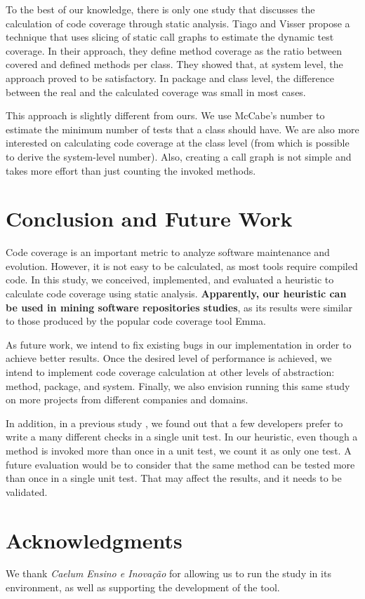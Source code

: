 \documentclass{sig-alternate}
\begin{document}
To the best of our knowledge, there is only one study that discusses the calculation of
code coverage through static analysis. Tiago and Visser \cite{tiago} propose a
technique that uses slicing of static call graphs to estimate the
dynamic test coverage. 
In their approach, they define method coverage as the ratio between covered 
and defined methods per class. They showed that, at system level, the approach
proved to be satisfactory. In package and class level, the difference between
the real and the calculated coverage was small in most cases.

This approach is slightly different from ours. We use McCabe's number to estimate the
minimum number of tests that a class should have. We are also more interested on calculating
code coverage at the class level (from which is possible to derive the system-level number). 
Also, creating a call graph is not simple and takes more effort than just counting
the invoked methods.

\section{Conclusion and Future Work}
\label{sec-conclusion}

Code coverage is an important metric to analyze software maintenance and evolution. However, it is 
not easy to be calculated, as most tools require compiled code. In this study, we conceived, implemented, 
and evaluated a heuristic to calculate code coverage using static analysis. 
\textbf{Apparently, our heuristic can be used in mining software repositories studies}, 
as its results were similar to those produced by the popular code coverage tool Emma. 

As future work, we intend to fix existing bugs in our implementation in order to
achieve better results. Once the desired level of performance is achieved, we intend to implement code coverage
calculation at other levels of abstraction: method, package, and system. Finally, we also 
envision running this same study on more projects from different companies and domains.

In addition, in a previous study \cite{aniche-csmr}, 
we found out that a few developers prefer to write a many different checks in a single
unit test. In our heuristic, even though a method is invoked more than once in a unit test, we count it 
as only one test. A future evaluation would be to consider that the same method can be tested more than once
in a single unit test. That may affect the results, and it needs to be validated.


\section{Acknowledgments}

We thank \textit{Caelum Ensino e Inovação} for allowing us to run the study in its environment,
as well as supporting the development of the tool.



\end{document}
